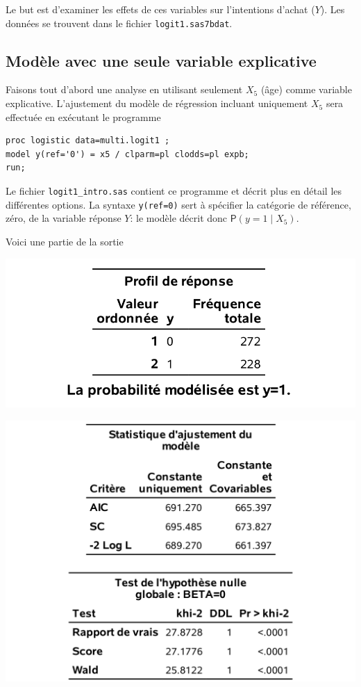 \documentclass[
  11pt,
  letterpaper,
]{book}
\theoremstyle{definition}
\theoremstyle{definition}
\theoremstyle{definition}
\theoremstyle{remark}
\begin{document}
Le but est d'examiner les effets de ces variables sur l'intentions d'achat (\(Y\)). Les données se trouvent dans le fichier \texttt{logit1.sas7bdat}.

\hypertarget{moduxe8le-avec-une-seule-variable-explicative}{%
\subsection{Modèle avec une seule variable explicative}\label{moduxe8le-avec-une-seule-variable-explicative}}

Faisons tout d'abord une analyse en utilisant seulement \(X_5\) (âge) comme variable explicative. L'ajustement du modèle de régression incluant uniquement \(X_5\) sera effectuée en exécutant le programme

\begin{verbatim}
proc logistic data=multi.logit1 ;
model y(ref='0') = x5 / clparm=pl clodds=pl expb;
run;
\end{verbatim}

Le fichier \texttt{logit1\_intro.sas} contient ce programme et décrit plus en détail les différentes options. La syntaxe \texttt{y(ref=\textquotesingle{}0\textquotesingle{})} sert à spécifier la catégorie de référence, zéro, de la variable réponse \(Y\): le modèle décrit donc \({\mathsf P}\left(y=1 \mid X_5\right)\).

Voici une partie de la sortie

\begin{center}\includegraphics[width=0.63\linewidth]{figures/03-logistic-e1} \end{center}

\begin{center}\includegraphics[width=0.8\linewidth]{figures/03-logistic-e2} \end{center}
\end{document}
